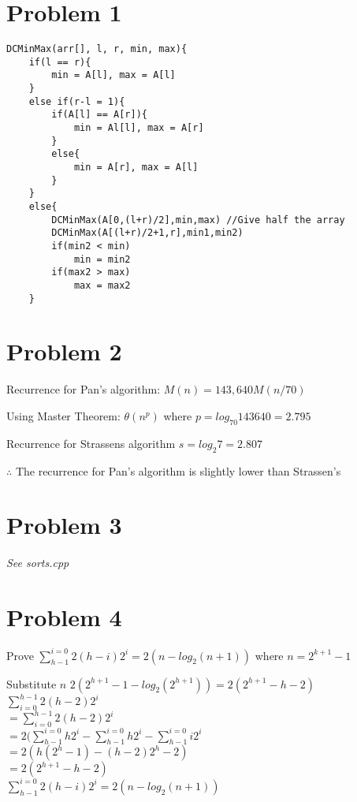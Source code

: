 \documentclass[12pt,letterpaper]{article}
\begin{document}
\section*{Problem 1}
\begin{lstlisting}[style=pseudo]
DCMinMax(arr[], l, r, min, max){
	if(l == r){
		min = A[l], max = A[l]
	}
	else if(r-l = 1){
		if(A[l] == A[r]){
			min = Al[l], max = A[r]
		}
		else{
			min = A[r], max = A[l]
		}
	}
	else{
		DCMinMax(A[0,(l+r)/2],min,max) //Give half the array
		DCMinMax(A[(l+r)/2+1,r],min1,min2)
		if(min2 < min)
			min = min2
		if(max2 > max)
			max = max2
	}
\end{lstlisting}


\section*{Problem 2}
Recurrence for Pan's algorithm:
$M(n) = 143,640M(n/70)$

Using Master Theorem:
$\theta(n^p)$ where $p=log_{70}143640 = 2.795$

Recurrence for Strassens algorithm $s = log_{2}7 = 2.807$

$\therefore$ The recurrence for Pan's algorithm is slightly lower than Strassen's

\section*{Problem 3}
\textit{See sorts.cpp}
\newpage
\section*{Problem 4}
Prove $\sum_{h-1}^{i=0}2(h-i)2^{i} = 2(n-log_{2}(n+1))$ where $n=2^{k+1}-1$

Substitute $n$ $2(2^{h+1}-1-log_{2}(2^{h+1})) = 2(2^{h+1}-h-2)$ 
\\$\sum_{i=0}^{h-1}2(h-2)2^{i}$
\\$= \sum_{i=0}^{h-1}2(h-2)2^{i}$
\\$= 2(\sum_{h-1}^{i=0}h2^{i} -\sum_{h-1}^{i=0} h2^{i}-\sum_{h-1}^{i=0}i2^{i}$
\\$= 2(h(2^{h}-1)-(h-2)2^{h}-2)$
\\$= 2(2^{h+1}-h-2)$
\\\therefore $\sum_{h-1}^{i=0}2(h-i)2^{i} = 2(n-log_{2}(n+1))$
\end{document}
